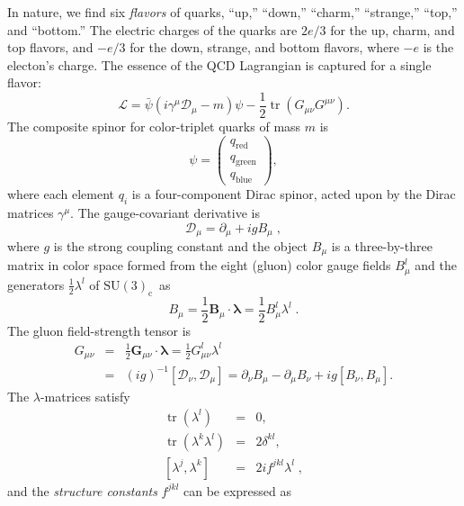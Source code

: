 \documentclass[11pt,prb,groupedaddress,nofootinbib,showpacs,floatfix]{revtex4-1}
\renewcommand{\cfrac}[2]{{\frac{#1}{#2}}}
\newcommand{\cgg}{\ensuremath{\mathrm{SU(3)}_{\mathrm{c}}}}
\newcommand{\D}{\ensuremath{\mathcal{D}}}
\newcommand{\tr}[1]{\mathop{\mathrm{tr}}#1}
\newcommand{\blambda}{\bm{\lambda}}
\begin{document}
In nature, we find six \emph{flavors} of quarks, ``up,'' ``down,'' 
``charm,'' ``strange,''  ``top,'' and ``bottom.''
The electric charges of the quarks are $2e/3$ for the up, charm, and top 
flavors, and $-e/3$ for the down, strange, and bottom flavors, where 
$-e$ is the electon's charge.
The essence of the QCD Lagrangian is captured for a single flavor:
\begin{equation}
	\mathcal{L} = \bar{\psi}(i \gamma^{\mu}\D_{\mu} -m)\psi -
	\cfrac{1}{2}\tr{(G_{\mu\nu}G^{\mu\nu})}.
	\label{eq:qcdlag}
\end{equation}
The composite spinor for color-triplet quarks of mass $m$ is
\begin{equation}
	\psi = \left( 
	\begin{array}{l}
	q_{\mathrm{red}} \\ q_{\mathrm{green}} \\ q_{\mathrm{blue}}
	\end{array}
	\right),
\end{equation}
where each element $q_i$ is a four-component Dirac spinor, acted upon 
by the Dirac matrices $\gamma^\mu$.
The gauge-covariant derivative is
\begin{equation}
\D_{\mu} = \partial_{\mu} + i g B_{\mu}\;,
\end{equation}
where $g$ is the strong coupling constant and the object $B_{\mu}$ is a
three-by-three matrix in color space formed from the eight (gluon)
color gauge fields $B^{l}_{\mu}$ and the generators 
$\cfrac{1}{2}\lambda^{l}$ of \cgg\ as
\begin{equation}
B_{\mu} = \cfrac{1}{2} \bm{B}_{\mu} \cdot \blambda  =
\cfrac{1}{2}B^{l}_{\mu}\lambda^{l}\;.
\end{equation}
The gluon field-strength tensor is
\begin{eqnarray}
G_{\mu\nu} & = & \cfrac{1}{2}\bm{G}_{\mu\nu} \cdot \blambda =
\cfrac{1}{2}G^{l}_{\mu\nu}\lambda^{l} \\
 & = & (ig)^{-1}\left[\D_{\nu},\D_{\mu}\right] = 
 \partial_{\nu}B_{\mu} - \partial_{\mu}B_{\nu} +
ig\left[B_{\nu},B_{\mu}\right].
 \nonumber
\end{eqnarray}
The $\lambda$-matrices satisfy
\begin{eqnarray}
\tr{(\lambda^{l})} & = & 0, \\
\tr{(\lambda^{k}\lambda^{l})} & = & 2\delta^{kl} ,\\
\left[\lambda^{j},\lambda^{k}\right] & = & 2if^{jkl}\lambda^{l}\;,
\end{eqnarray}
and the \emph{structure constants} $f^{jkl}$ can be expressed as
\end{document}
